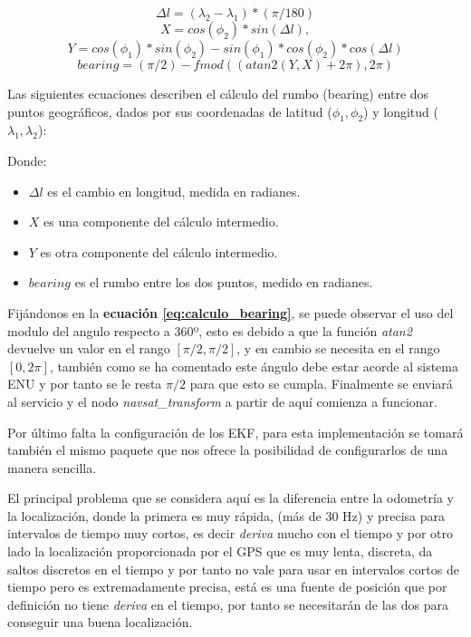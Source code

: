 \begin{equation}\label{eq:delta_longitud}
\Delta{l} =( \lambda_{2} - \lambda_{1} ) * (\pi/180) 
\end{equation}
\begin{equation}\label{eq:calculo_x}
X = cos(\phi_{2}) * sin(\Delta{l}), 
\end{equation}
\begin{equation}\label{eq:calculo_y}
Y = cos(\phi_{1}) * sin(\phi_{2}) - sin(\phi_{1}) * cos(\phi_{2}) * cos(\Delta{l})
\end{equation}
\begin{equation}\label{eq:calculo_bearing}
bearing = (\pi/2) - fmod((atan2(Y,X) + 2\pi),2\pi)
\end{equation}

Las siguientes ecuaciones describen el cálculo del rumbo (bearing) entre dos puntos geográficos, dados por sus coordenadas de 
latitud (\(\phi_1, \phi_2\)) y longitud (\(\lambda_1, \lambda_2\)):

Donde:
\begin{itemize}
    \item \(\Delta{l}\) es el cambio en longitud, medida en radianes.
    \item \(X\) es una componente del cálculo intermedio.
    \item \(Y\) es otra componente del cálculo intermedio.
    \item \({bearing}\) es el rumbo entre los dos puntos, medido en radianes.
\end{itemize}

Fijándonos en la \textbf{ecuación \ref{eq:calculo_bearing}}, se puede observar el uso del modulo del angulo respecto a 360º, esto es debido 
a que la función \textit{atan2} devuelve un valor en el rango $[ \pi/2,\pi/2 ]$, y en cambio se necesita en
el rango $[0, 2\pi]$, también como se ha comentado este ángulo debe estar acorde al sistema ENU y por tanto se le resta $\pi/2$ para que esto se cumpla. Finalmente 
se enviará al servicio y el nodo  \textit{navsat\_transform} a partir de aquí comienza a funcionar.

Por último falta la configuración de los EKF, para esta implementación se tomará también el mismo paquete que nos ofrece la posibilidad de 
configurarlos de una manera sencilla.

El principal problema que se considera aquí es la diferencia entre la odometría y la localización, donde la primera es muy rápida, 
(más de 30 Hz) y precisa para intervalos de tiempo muy cortos, es decir \textit{deriva} mucho con el tiempo y por otro
lado la localización proporcionada por el GPS que es muy lenta, discreta, da saltos discretos en el tiempo y por tanto no vale para usar en 
intervalos cortos de tiempo pero es extremadamente precisa, está es una fuente de posición que por definición no tiene
\textit{deriva} en el tiempo, por tanto se necesitarán de las dos para conseguir una buena localización.

